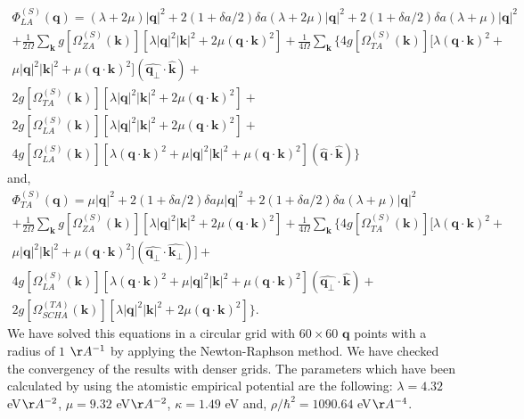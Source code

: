 \begin{multline}
 \Phi_{LA}^{(S)}(\boldsymbol{q})=(\lambda+2\mu)|\boldsymbol{q}|^{2}+2(1+\delta a/2)\delta a(\lambda+2\mu)|\boldsymbol{q}|^{2}+2(1+\delta a/2)\delta a(\lambda+\mu)|\boldsymbol{q}|^{2}\\+\frac{1}{2\Omega}\sum_{\boldsymbol{k}}g[\Omega_{ZA}^{(S)}(\boldsymbol{k})][\lambda|\boldsymbol{q}|^{2}|\boldsymbol{k}|^{2}+2\mu(\boldsymbol{q}\cdot\boldsymbol{k})^{2}]+\frac{1}{4\Omega}\sum_{\boldsymbol{k}}\{4g[\Omega_{TA}^{(S)}(\boldsymbol{k})][\lambda(\boldsymbol{q}\cdot\boldsymbol{
 k})^{2}+\\\mu|\boldsymbol{q}|^{2}|\boldsymbol{k}|^{2}+\mu(\boldsymbol{q}\cdot\boldsymbol{k})^{2}](\hat{\boldsymbol{q}_{\perp}}\cdot\hat{\boldsymbol{k}})+ \\ 2g[\Omega_{TA}^{(S)}(\boldsymbol{k})][\lambda|\boldsymbol{q}|^{2}|\boldsymbol{
 k}|^{2}+2\mu(\boldsymbol{q}\cdot\boldsymbol{k})^{2}]+ \\ 2g[\Omega_{LA}^{(S)}(\boldsymbol{k})][\lambda|\boldsymbol{q}|^{2}|\boldsymbol{k}|^{2}+2\mu(\boldsymbol{q}\cdot\boldsymbol{k})^{2}]+ \\ 4g[\Omega_{LA}^{(S)}(\boldsymbol{
 k})][\lambda(\boldsymbol{q}\cdot\boldsymbol{k})^{2}+\mu|\boldsymbol{q}|^{2}|\boldsymbol{k}|^{2}+\mu(\boldsymbol{q}\cdot\boldsymbol{k})^{2}](\hat{\boldsymbol{q}}\cdot\hat{\boldsymbol{k}})\}
\end{multline}
and,
\begin{multline}
 \Phi_{TA}^{(S)}(\boldsymbol{q})=\mu|\boldsymbol{q}|^{2}+2(1+\delta a/2)\delta a\mu|\boldsymbol{q}|^{2}+2(1+\delta a/2)\delta a(\lambda+\mu)|\boldsymbol{q}|^{2}\\+\frac{1}{2\Omega}\sum_{\boldsymbol{k}}g[\Omega_{ZA}^{(S)}(\boldsymbol{k})][\lambda|\boldsymbol{q}|^{2}|\boldsymbol{k}|^{2}+2\mu(\boldsymbol{q}\cdot\boldsymbol{k})^{2}]+\frac{1}{4\Omega}\sum_{\boldsymbol{k}}\{
 4g[\Omega_{TA}^{(S)}(\boldsymbol{k})][\lambda(\boldsymbol{q}\cdot\boldsymbol{k})^{2}+\\\mu|\boldsymbol{q}|^{2}|\boldsymbol{k}|^{2}+\mu(\boldsymbol{q}\cdot\boldsymbol{k})^{2}](\hat{\boldsymbol{q}_{\perp}}\cdot\hat{
 \boldsymbol{k}_{\perp}})]+\\4g[\Omega_{LA}^{(S)}(\boldsymbol{k})][\lambda(\boldsymbol{q}\cdot\boldsymbol{k})^{2}+\mu|\boldsymbol{q}|^{2}|\boldsymbol{k}|^{2}+\mu(\boldsymbol{q}\cdot\boldsymbol{k})^{2}](\hat{\boldsymbol{
 q}_{\perp}}\cdot\hat{\boldsymbol{k}})+ \\ 2g[\Omega_{SCHA}^{(TA)}(\boldsymbol{k})][\lambda|\boldsymbol{q}|^{2}|\boldsymbol{k}|^{2}+2\mu(\boldsymbol{q}\cdot\boldsymbol{k})^{2}]  \}.
\end{multline}
We have solved this equations in a circular grid with $60\times60$ $\boldsymbol{q}$ points with a radius of $1$ 
$\AA^{-1}$ by applying the Newton-Raphson method. We have checked the convergency of the results with denser grids. 
The parameters which have been calculated by using the atomistic empirical potential are the following: 
$\lambda=4.32$ eV$\AA^{-2}$, $\mu=9.32$ eV$\AA^{-2}$, $\kappa=1.49$ eV and, $\rho/\hbar^{2}=1090.64$ eV$\AA^{-4}$. \\

